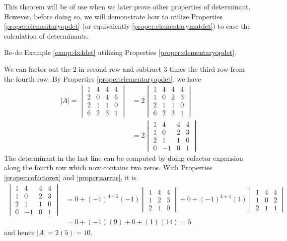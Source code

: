 This theorem will be of use when we later prove other properties of determinant. However, before doing so, we will demonstrate how to utilize Properties \ref{proper:elementaryopdet} (or equivalently \ref{proper:elementarymatdet}) to ease the calculation of determinants.
\begin{exmp}
Re-do Example \ref{exmp:4x4det} utilizing Properties \ref{proper:elementaryopdet}.
\end{exmp}
\begin{solution}
We can factor out the $2$ in second row and subtract $3$ times the third row from the fourth row. By Properties \ref{proper:elementaryopdet}, we have
\begin{align*}
|A| = 
\begin{vmatrix}
1 & 4 & 4 & 4 \\
2 & 0 & 4 & 6 \\
2 & 1 & 1 & 0 \\
6 & 2 & 3 & 1
\end{vmatrix}
&=
2
\begin{vmatrix}
1 & 4 & 4 & 4 \\
1 & 0 & 2 & 3 \\
2 & 1 & 1 & 0 \\
6 & 2 & 3 & 1
\end{vmatrix} \\
&= 
2
\begin{vmatrix}
1 & 4 & 4 & 4 \\
1 & 0 & 2 & 3 \\
2 & 1 & 1 & 0 \\
0 & -1 & 0 & 1
\end{vmatrix} 
\end{align*}
The determinant in the last line can be computed by doing cofactor expansion along the fourth row which now contains two zeros. With Properties \ref{proper:cofactorex} and \ref{proper:sarrus}, it is
\begin{align*}
\begin{vmatrix}
1 & 4 & 4 & 4 \\
1 & 0 & 2 & 3 \\
2 & 1 & 1 & 0 \\
0 & -1 & 0 & 1
\end{vmatrix}
&= 0 + (-1)^{4+2}(-1)
\begin{vmatrix}
1 & 4 & 4 \\
1 & 2 & 3 \\
2 & 1 & 0 
\end{vmatrix} 
+ 0 + (-1)^{4+4}(1)
\begin{vmatrix}
1 & 4 & 4 \\
1 & 0 & 2 \\
2 & 1 & 1 
\end{vmatrix} \\
&= 0 + (-1)(9) + 0 + (1)(14) = 5
\end{align*}
and hence $|A| = 2(5) = 10$.
\end{solution}

